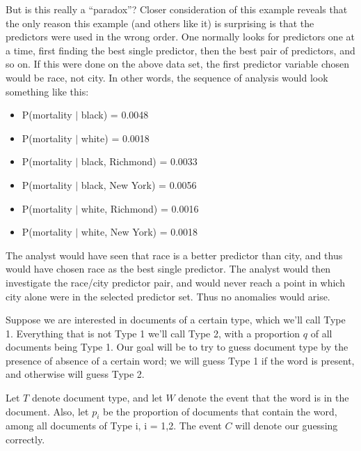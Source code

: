 But is this really a ``paradox''?   Closer consideration of this example
reveals that the only reason this example (and others like it) is
surprising is that the predictors were used in the wrong order.  One
normally looks for predictors one at a time, first finding the best
single predictor, then the best pair of predictors, and so on.  If this
were done on the above data set, the first predictor variable chosen
would be race, not city.  In other words, the sequence of analysis would
look something like this: 

\begin{itemize}

\item P(mortality $|$ black) = 0.0048

\item P(mortality $|$ white) = 0.0018

\item P(mortality $|$ black, Richmond) = 0.0033

\item P(mortality $|$ black, New York) = 0.0056

\item P(mortality $|$ white, Richmond) = 0.0016

\item P(mortality $|$ white, New York) = 0.0018

\end{itemize}

The analyst would have seen that race is a better predictor than city,
and thus would have chosen race as the best single predictor.  The
analyst would then investigate the race/city predictor pair, and
would never reach a point in which city alone were in the
selected predictor set.  Thus no anomalies would arise.

\startproblemset

\oneproblem
Suppose we are interested in documents of a certain type, which we'll
call Type 1.  Everything that is not Type 1 we'll call Type 2, with
a proportion $q$ of all documents being Type 1.  Our goal will be to 
try to guess document type by the presence of absence of a certain word;
we will guess Type 1 if the word is present, and otherwise will guess
Type 2.  

Let $T$ denote document type, and let $W$ denote the event that the word
is in the document.  Also, let $p_i$ be the proportion of documents that
contain the word, among all documents of Type i, i = 1,2.  The event $C$
will denote our guessing correctly.

